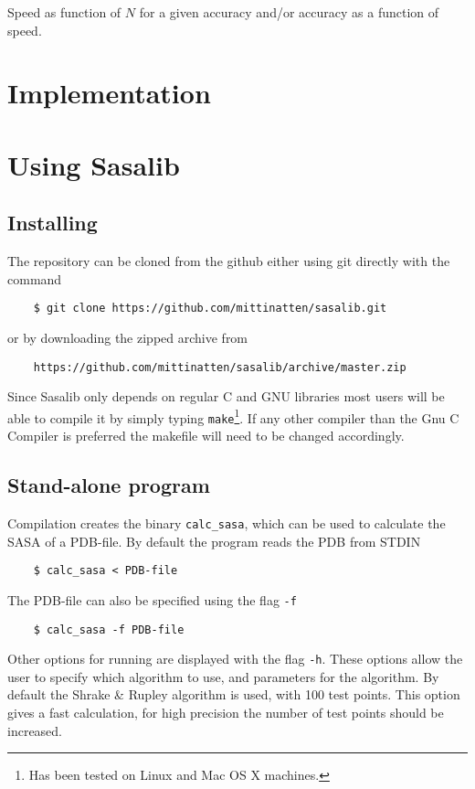 \documentclass[a4paper,11pt]{article}
\begin{document}
Speed as function of $N$ for a given accuracy and/or accuracy as a
function of speed.

\section{Implementation}

\section{Using Sasalib}

\subsection{Installing}

The repository can be cloned from the github either using git
directly with the command
\begin{verbatim}
    $ git clone https://github.com/mittinatten/sasalib.git
\end{verbatim}
or by downloading the zipped archive from
\begin{verbatim}
    https://github.com/mittinatten/sasalib/archive/master.zip
\end{verbatim}
Since Sasalib only depends on regular C and GNU libraries most users
will be able to compile it by simply typing \texttt{make}\footnote{Has
  been tested on Linux and Mac OS X machines.}. If any other compiler
than the Gnu C Compiler is preferred the makefile will need to be
changed accordingly.

\subsection{Stand-alone program}

Compilation creates the binary \texttt{calc\_sasa}, which can be used
to calculate the SASA of a PDB-file. By default the program reads the
PDB from STDIN
\begin{verbatim} 
    $ calc_sasa < PDB-file    
\end{verbatim}
The PDB-file can also be specified using the flag \texttt{-f}
\begin{verbatim}
    $ calc_sasa -f PDB-file
\end{verbatim}
Other options for running are displayed with the flag
\texttt{-h}. These options allow the user to specify which algorithm
to use, and parameters for the algorithm. By default the Shrake \&
Rupley algorithm is used, with 100 test points. This option gives a
fast calculation, for high precision the number of test points should
be increased. 
\end{document}
